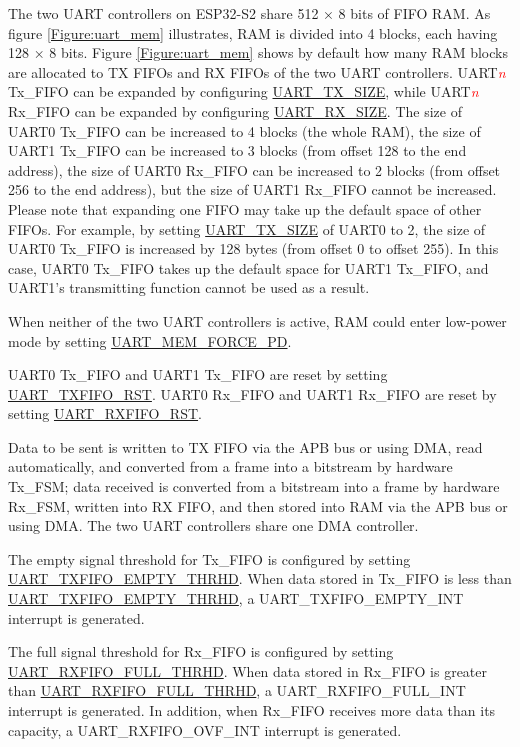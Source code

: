 \documentclass[main\_\_EN.tex]{subfiles}
\begin{document}
The two UART controllers on ESP32-S2 share 512 × 8 bits of FIFO RAM. As figure  \ref{Figure:uart_mem} illustrates, RAM is divided into 4 blocks, each having 128 × 8 bits. Figure \ref{Figure:uart_mem} shows by default how many RAM blocks are allocated to TX FIFOs and RX FIFOs of the two UART controllers. UART\textcolor{red}{\it{n}} Tx\_FIFO can be expanded by configuring \hyperref[fielddesc:UARTTXSIZE]{UART\_TX\_SIZE}, while UART\textcolor{red}{\it{n}} Rx\_FIFO can be expanded by configuring \hyperref[fielddesc:UARTRXSIZE]{UART\_RX\_SIZE}. The size of UART0 Tx\_FIFO can be increased to 4 blocks (the whole RAM), the size of UART1 Tx\_FIFO can be increased to 3 blocks (from offset 128 to the end address), the size of UART0 Rx\_FIFO can be increased to 2 blocks (from offset 256 to the end address), but the size of UART1 Rx\_FIFO cannot be increased. Please note that expanding one FIFO may take up the default space of other FIFOs. For example, by setting \hyperref[fielddesc:UARTTXSIZE]{UART\_TX\_SIZE} of UART0 to 2, the size of UART0 Tx\_FIFO is increased by 128 bytes (from offset 0 to offset 255). In this case, UART0 Tx\_FIFO takes up the default space for UART1 Tx\_FIFO, and UART1's transmitting function cannot be used as a result.

When neither of the two UART controllers is active, RAM could enter low-power mode by setting \hyperref[fielddesc:UARTMEMFORCEPD]{UART\_MEM\_FORCE\_PD}.

UART0 Tx\_FIFO and UART1 Tx\_FIFO are reset by setting \hyperref[fielddesc:UARTTXFIFORST]{UART\_TXFIFO\_RST}. UART0 Rx\_FIFO and UART1 Rx\_FIFO are reset by setting \hyperref[fielddesc:UARTRXFIFORST]{UART\_RXFIFO\_RST}.

Data to be sent is written to TX FIFO via the APB bus or using DMA, read automatically, and converted from a frame into a bitstream by hardware Tx\_FSM; data received is converted from a bitstream into a frame by hardware Rx\_FSM, written into RX FIFO, and then stored into RAM via the APB bus or using DMA. The two UART controllers share one DMA controller.

The empty signal threshold for Tx\_FIFO is configured by setting \hyperref[fielddesc:UARTTXFIFOEMPTYTHRHD]{UART\_TXFIFO\_EMPTY\_THRHD}. When data stored in Tx\_FIFO is less than \hyperref[fielddesc:UARTTXFIFOEMPTYTHRHD]{UART\_TXFIFO\_EMPTY\_THRHD}, a UART\_TXFIFO\_EMPTY\_INT interrupt is generated.

The full signal threshold for Rx\_FIFO is configured by setting \hyperref[fielddesc:UARTRXFIFOFULLTHRHD]{UART\_RXFIFO\_FULL\_THRHD}. When data stored in Rx\_FIFO is greater than \hyperref[fielddesc:UARTRXFIFOFULLTHRHD]{UART\_RXFIFO\_FULL\_THRHD}, a UART\_RXFIFO\_FULL\_INT interrupt is generated. In addition, when Rx\_FIFO receives more data than its capacity, a UART\_RXFIFO\_OVF\_INT interrupt is generated.
\end{document}
